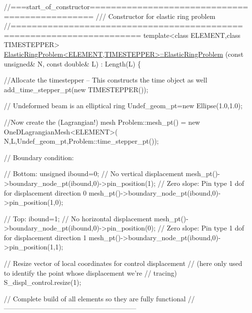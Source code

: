 \begin{DoxyCodeInclude}
\textcolor{comment}{//===start\_of\_constructor===============================================}\textcolor{comment}{}
\textcolor{comment}{/// Constructor for elastic ring problem}
\textcolor{comment}{}\textcolor{comment}{//======================================================================}
\textcolor{keyword}{template}<\textcolor{keyword}{class} ELEMENT,\textcolor{keyword}{class} TIMESTEPPER>
\hyperlink{classElasticRingProblem_a57be33a379c1ec4418a7fb3e8db8ef2b}{ElasticRingProblem<ELEMENT,TIMESTEPPER>::ElasticRingProblem}
(\textcolor{keyword}{const} \textcolor{keywordtype}{unsigned}& N, \textcolor{keyword}{const} \textcolor{keywordtype}{double}& L) 
 : Length(L)
\{

 \textcolor{comment}{//Allocate the timestepper -- This constructs the time object as well}
 add\_time\_stepper\_pt(\textcolor{keyword}{new} TIMESTEPPER());

 \textcolor{comment}{// Undeformed beam is an elliptical ring }
 Undef\_geom\_pt=\textcolor{keyword}{new} Ellipse(1.0,1.0); 

 \textcolor{comment}{//Now create the (Lagrangian!) mesh}
 Problem::mesh\_pt() = \textcolor{keyword}{new} OneDLagrangianMesh<ELEMENT>(
  N,L,Undef\_geom\_pt,Problem::time\_stepper\_pt()); 

 \textcolor{comment}{// Boundary condition: }

 \textcolor{comment}{// Bottom: }
 \textcolor{keywordtype}{unsigned} ibound=0;
 \textcolor{comment}{// No vertical displacement}
 mesh\_pt()->boundary\_node\_pt(ibound,0)->pin\_position(1); 
 \textcolor{comment}{// Zero slope: Pin type 1 dof for displacement direction 0 }
 mesh\_pt()->boundary\_node\_pt(ibound,0)->pin\_position(1,0);

 \textcolor{comment}{// Top: }
 ibound=1;
 \textcolor{comment}{// No horizontal displacement}
 mesh\_pt()->boundary\_node\_pt(ibound,0)->pin\_position(0); 
 \textcolor{comment}{// Zero slope: Pin type 1 dof for displacement direction 1}
 mesh\_pt()->boundary\_node\_pt(ibound,0)->pin\_position(1,1); 

 
 \textcolor{comment}{// Resize vector of local coordinates for control displacement}
 \textcolor{comment}{// (here only used to identify the point whose displacement we're}
 \textcolor{comment}{// tracing)}
 S\_displ\_control.resize(1);

 \textcolor{comment}{// Complete build of all elements so they are fully functional}
 \textcolor{comment}{// -----------------------------------------------------------}


\end{DoxyCodeInclude}
